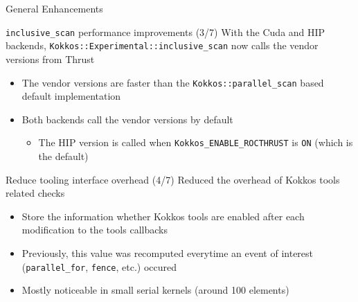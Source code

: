 
\begin{frame}[fragile]

  {\Huge General Enhancements}

  \vspace{10pt}

\end{frame}

\begin{frame}[fragile]{\texttt{inclusive\_scan} performance improvements (3/7)}
  With the Cuda and HIP backends, \texttt{Kokkos::Experimental::inclusive\_scan} now calls the vendor versions from Thrust
  \begin{itemize}
     \item The vendor versions are faster than the \texttt{Kokkos::parallel\_scan} based default implementation
     \item Both backends call the vendor versions by default
       \begin{itemize}
         \item The HIP version is called when \texttt{Kokkos\_ENABLE\_ROCTHRUST} is \texttt{ON} (which is the default)
       \end{itemize}
  \end{itemize}
\end{frame}

\begin{frame}[fragile]{Reduce tooling interface overhead (4/7)}
  Reduced the overhead of Kokkos tools related checks
  \begin{itemize}
      \item Store the information whether Kokkos tools are enabled after each modification to the tools callbacks
      \item Previously, this value was recomputed everytime an event of interest (\texttt{parallel\_for}, \texttt{fence}, etc.) occured
      \item Mostly noticeable in small serial kernels (around 100 elements)
  \end{itemize}
\end{frame}




